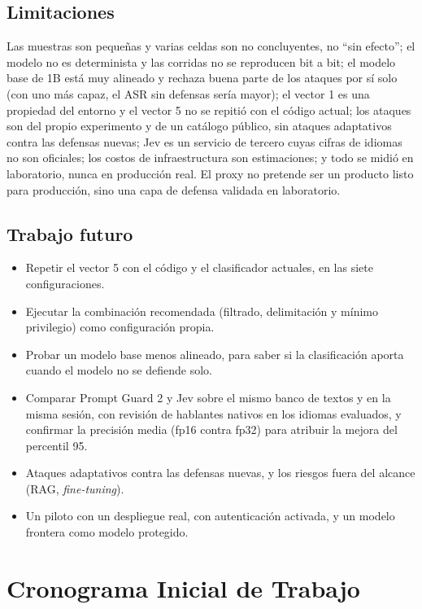 \documentclass[11pt,letterpaper]{article}
\begin{document}
\subsection{Limitaciones}

Las muestras son pequeñas y varias celdas son no concluyentes, no ``sin efecto''; el modelo no es determinista y las corridas no se reproducen bit a bit; el modelo base de 1B está muy alineado y rechaza buena parte de los ataques por sí solo (con uno más capaz, el ASR sin defensas sería mayor); el vector 1 es una propiedad del entorno y el vector 5 no se repitió con el código actual; los ataques son del propio experimento y de un catálogo público, sin ataques adaptativos contra las defensas nuevas; Jev es un servicio de tercero cuyas cifras de idiomas no son oficiales; los costos de infraestructura son estimaciones; y todo se midió en laboratorio, nunca en producción real. El proxy no pretende ser un producto listo para producción, sino una capa de defensa validada en laboratorio.

\subsection{Trabajo futuro}

\begin{itemize}[leftmargin=1.2cm, itemsep=2pt]
\item Repetir el vector 5 con el código y el clasificador actuales, en las siete configuraciones.
\item Ejecutar la combinación recomendada (filtrado, delimitación y mínimo privilegio) como configuración propia.
\item Probar un modelo base menos alineado, para saber si la clasificación aporta cuando el modelo no se defiende solo.
\item Comparar Prompt Guard 2 y Jev sobre el mismo banco de textos y en la misma sesión, con revisión de hablantes nativos en los idiomas evaluados, y confirmar la precisión media (fp16 contra fp32) para atribuir la mejora del percentil 95.
\item Ataques adaptativos contra las defensas nuevas, y los riesgos fuera del alcance (RAG, \emph{fine-tuning}).
\item Un piloto con un despliegue real, con autenticación activada, y un modelo frontera como modelo protegido.
\end{itemize}


\section{Cronograma Inicial de Trabajo}
\end{document}
